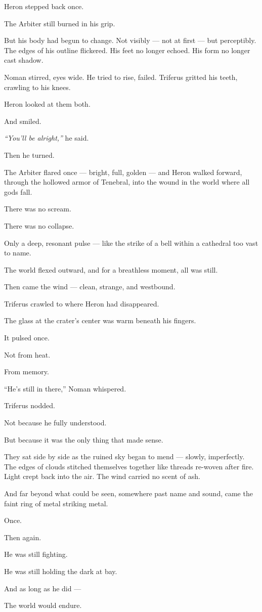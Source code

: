 \documentclass[9pt]{article}
\begin{document}
Heron stepped back once.

The Arbiter still burned in his grip.

But his body had begun to change. Not visibly — not at first — but perceptibly. The edges of his outline flickered. His feet no longer echoed. His form no longer cast shadow.

Noman stirred, eyes wide. He tried to rise, failed. Triferus gritted his teeth, crawling to his knees.

\bigskip

Heron looked at them both.

And smiled.

\textit{“You’ll be alright,”} he said.

Then he turned.

The Arbiter flared once — bright, full, golden — and Heron walked forward, through the hollowed armor of Tenebral, into the wound in the world where all gods fall.

\bigskip

There was no scream.

There was no collapse.

Only a deep, resonant pulse — like the strike of a bell within a cathedral too vast to name.

The world flexed outward, and for a breathless moment, all was still.

Then came the wind — clean, strange, and westbound.

\bigskip

Triferus crawled to where Heron had disappeared.

The glass at the crater’s center was warm beneath his fingers.

It pulsed once.

Not from heat.

From memory.

\bigskip

“He’s still in there,” Noman whispered.

Triferus nodded.

Not because he fully understood.

But because it was the only thing that made sense.

\bigskip

They sat side by side as the ruined sky began to mend — slowly, imperfectly. The edges of clouds stitched themselves together like threads re-woven after fire. Light crept back into the air. The wind carried no scent of ash.

And far beyond what could be seen, somewhere past name and sound, came the faint ring of metal striking metal.

Once.

Then again.

\bigskip

He was still fighting.

He was still holding the dark at bay.

And as long as he did —

The world would endure.
\end{document}
